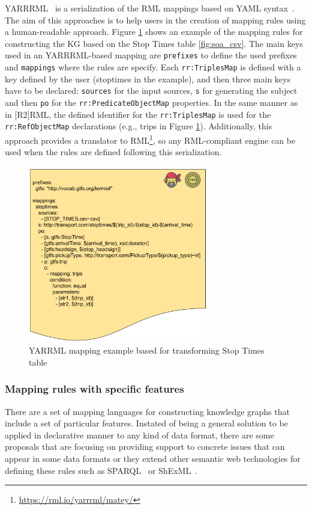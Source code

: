 YARRRML~\citep{Heyvaert2018Declarative} is a serialization of the RML mappings based on YAML syntax~\citep{ben2001yaml}. The aim of this approaches is to help users in the creation of mapping rules using a human-readable approach. Figure \ref{fig:soa_yarrrml} shows an example of the mapping rules for constructing the KG based on the Stop Times table \ref{fig:soa_csv}. The main keys used in an YARRRML-based mapping are \texttt{prefixes} to define the used prefixes and \texttt{mappings} where the rules are specify. Each \texttt{rr:TriplesMap} is defined with a key defined by the user (stoptimes in the example), and then three main keys have to be declared: \texttt{sources} for the input sources, \texttt{s} for generating the subject and then \texttt{po} for the \texttt{rr:PredicateObjectMap} properties. In the same manner as in [R2]RML, the defined identifier for the \texttt{rr:TriplesMap} is used for the \texttt{rr:RefObjectMap} declarations (e.g., trips in Figure \ref{fig:soa_yarrrml}). Additionally, this approach provides a translator to RML\footnote{\url{https://rml.io/yarrrml/matey/}}, so any RML-compliant engine can be used when the rules are defined following this serialization.




\begin{figure}[!ht]
\centering
\includegraphics[width=0.7\textwidth]{figures/state-of-the-art/YARRRML example.pdf}
\caption{YARRML mapping example based for transforming Stop Times table}
\label{fig:soa_yarrrml}
\end{figure}

\subsubsection{Mapping rules with specific features}
There are a set of mapping languages for constructing knowledge graphs that include a set of particular features. Instated of being a general solution to be applied in declarative manner to any kind of data format, there are some proposals that are focusing on providing support to concrete issues that can appear in some data formats or they extend other semantic web technologies for defining these rules such as SPARQL~\citep{SPARQL} or ShExML~\citep{prud2014shape}.  

